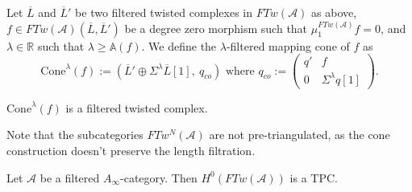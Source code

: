 \begin{dfn}
	Let $\overline{L}$ and $\overline{L}'$ be two filtered twisted complexes in $FTw(\mathcal{A})$ as above, $f\in FTw(\mathcal{A})(\overline{L}, \overline{L}')$ be a degree zero morphism such that $\mu_1^{FTw(\mathcal{A})}f=0$, and $\lambda\in \mathbb R$ such that $\lambda\geq \mathbb{A}(f)$. We define the $\lambda$-filtered mapping cone of $f$ as $$\text{Cone}^{\lambda}(f) := \left(\overline{L}'\oplus \Sigma^{\lambda}\overline{L}[1], \ q_{co}\right) \text{   where  }q_{co} := \begin{pmatrix}
		q' & f \\
		0 & \Sigma^\lambda q[1]
	\end{pmatrix}.$$
\end{dfn}
\begin{lem}
	$\text{Cone}^{\lambda}(f)$ is a filtered twisted complex.
\end{lem}
\begin{rem}
	Note that the subcategories $FTw^N(\mathcal{A})$ are not pre-triangulated, as the cone construction doesn't preserve the length filtration.
\end{rem}
\begin{prop}
	Let $\mathcal{A}$ be a filtered $A_\infty$-category. Then $H^0(FTw(\mathcal{A}))$ is a TPC.
\end{prop}


